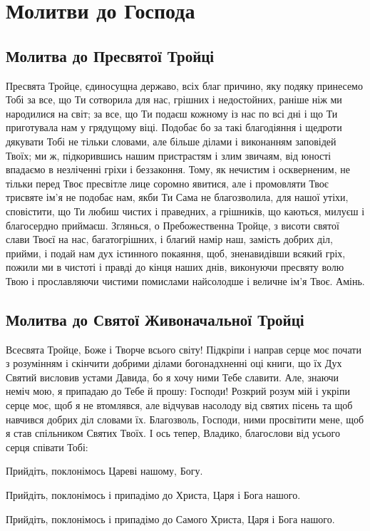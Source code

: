 \documentclass[chapters.tex]{subfiles}
\begin{document}
\chapter{Молитви до Господа}
\section{Молитва до Пресвятої Тройці}
Пресвята Тройце, єдиносущна державо, всіх благ причино, яку подяку принесемо Тобі за все, що Ти сотворила для нас, грішних і недостойних, раніше ніж ми народилися на світ; за все, що Ти подаєш кожному із нас по всі дні і що Ти приготувала нам у грядущому віці. Подобає бо за такі благодіяння і щедроти дякувати Тобі не тільки словами, але більше ділами і виконанням заповідей Твоїх; ми ж, підкорившись нашим пристрастям і злим звичаям, від юності впадаємо в незліченні гріхи і беззаконня. Тому, як нечистим і оскверненим, не тільки перед Твоє пресвітле лице соромно явитися, але і промовляти Твоє трисвяте ім’я не подобає нам, якби Ти Сама не благозволила, для нашої утіхи, сповістити, що Ти любиш чистих і праведних, а грішників, що каються, милуєш і благосердно приймаєш. Зглянься, о Пребожественна Тройце, з висоти святої слави Твоєї на нас, багатогрішних, і благий намір наш, замість добрих діл, прийми, і подай нам дух істинного покаяння, щоб, зненавидівши всякий гріх, пожили ми в чистоті і правді до кінця наших днів, виконуючи пресвяту волю Твою і прославляючи чистими помислами найсолодше і величне ім’я Твоє. Амінь.

\section{Молитва до Святої Живоначальної Тройці}
Всесвята Тройце, Боже і Творче всього світу! Підкріпи і направ серце моє почати з розумінням і скінчити добрими ділами богонадхненні оці книги, що їх Дух Святий висловив устами Давида, бо я хочу ними Тебе славити. Але, знаючи неміч мою, я припадаю до Тебе й прошу: Господи! Розкрий розум мій і укріпи серце моє, щоб я не втомлявся, але відчував насолоду від святих пісень та щоб навчився добрих діл словами їх. Благозволь, Господи, ними просвітити мене, щоб я став спільником Святих Твоїх. І ось тепер, Владико, благослови від усього серця співати Тобі:

Прийдіть, поклонімось Цареві нашому, Богу.

Прийдіть, поклонімось і припадімо до Христа, Царя і Бога нашого.

Прийдіть, поклонімось і припадімо до Самого Христа, Царя і Бога нашого.
\end{document}
